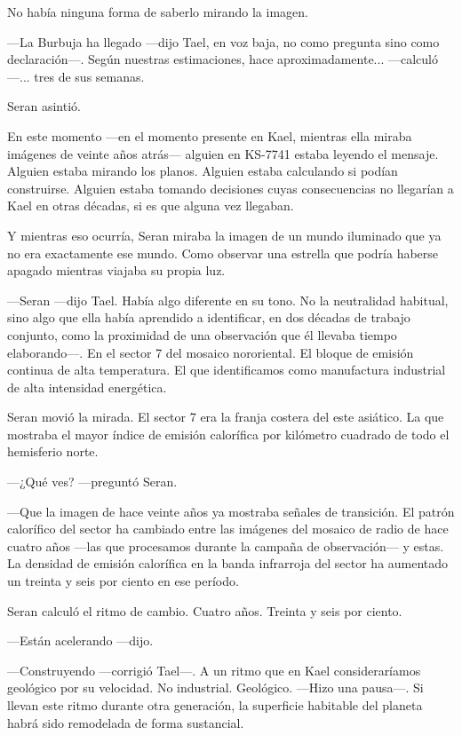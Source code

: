\documentclass[11pt,a5paper,twoside]{book}
\begin{document}
No había ninguna forma de saberlo mirando la imagen.

—La Burbuja ha llegado —dijo Tael, en voz baja, no como pregunta sino como declaración—. Según nuestras estimaciones, hace aproximadamente... —calculó—... tres de sus semanas.

Seran asintió.

En este momento —en el momento presente en Kael, mientras ella miraba imágenes de veinte años atrás— alguien en KS-7741 estaba leyendo el mensaje. Alguien estaba mirando los planos. Alguien estaba calculando si podían construirse. Alguien estaba tomando decisiones cuyas consecuencias no llegarían a Kael en otras décadas, si es que alguna vez llegaban.

Y mientras eso ocurría, Seran miraba la imagen de un mundo iluminado que ya no era exactamente ese mundo. Como observar una estrella que podría haberse apagado mientras viajaba su propia luz.

—Seran —dijo Tael. Había algo diferente en su tono. No la neutralidad habitual, sino algo que ella había aprendido a identificar, en dos décadas de trabajo conjunto, como la proximidad de una observación que él llevaba tiempo elaborando—. En el sector 7 del mosaico nororiental. El bloque de emisión continua de alta temperatura. El que identificamos como manufactura industrial de alta intensidad energética.

Seran movió la mirada. El sector 7 era la franja costera del este asiático. La que mostraba el mayor índice de emisión calorífica por kilómetro cuadrado de todo el hemisferio norte.

—¿Qué ves? —preguntó Seran.

—Que la imagen de hace veinte años ya mostraba señales de transición. El patrón calorífico del sector ha cambiado entre las imágenes del mosaico de radio de hace cuatro años —las que procesamos durante la campaña de observación— y estas. La densidad de emisión calorífica en la banda infrarroja del sector ha aumentado un treinta y seis por ciento en ese período.

Seran calculó el ritmo de cambio. Cuatro años. Treinta y seis por ciento.

—Están acelerando —dijo.

—Construyendo —corrigió Tael—. A un ritmo que en Kael consideraríamos geológico por su velocidad. No industrial. Geológico. —Hizo una pausa—. Si llevan este ritmo durante otra generación, la superficie habitable del planeta habrá sido remodelada de forma sustancial.
\end{document}
